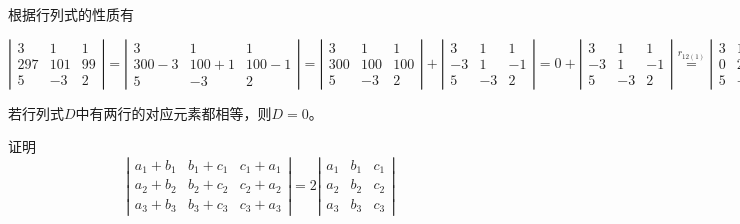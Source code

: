 \begin{solution}
    根据行列式的性质有

    $ \left|\begin{array}{cccc}
            3   & 1   & 1  \\
            297 & 101 & 99 \\
            5   & -3  & 2
        \end{array}\right|=
        \left|\begin{array}{cccc}
            3     & 1     & 1     \\
            300-3 & 100+1 & 100-1 \\
            5     & -3    & 2
        \end{array}\right|=
        \left|\begin{array}{cccc}
            3   & 1   & 1   \\
            300 & 100 & 100 \\
            5   & -3  & 2
        \end{array}\right|+
        \left|\begin{array}{cccc}
            3  & 1  & 1  \\
            -3 & 1  & -1 \\
            5  & -3 & 2
        \end{array}\right|
        = 0+\left|\begin{array}{cccc}
            3  & 1  & 1  \\
            -3 & 1  & -1 \\
            5  & -3 & 2
        \end{array}\right|
        \overset{r_{12(1)}}{=}
        \left|\begin{array}{cccc}
            3 & 1  & 1 \\
            0 & 2  & 0 \\
            5 & -3 & 2
        \end{array}\right|=12-10=2.$
\end{solution}


\begin{property}
    若行列式$D$中有两行的对应元素都相等，则$D=0$。
\end{property}

\begin{example}
    证明
    $$ \left|\begin{array}{cccc}
            a_{1}+b_{1} & b_{1}+c_{1} & c_{1}+a_{1} \\
            a_{2}+b_{2} & b_{2}+c_{2} & c_{2}+a_{2} \\
            a_{3}+b_{3} & b_{3}+c_{3} & c_{3}+a_{3}
        \end{array}\right|=2
        \left|\begin{array}{cccc}
            a_{1} & b_{1} & c_{1} \\
            a_{2} & b_{2} & c_{2} \\
            a_{3} & b_{3} & c_{3}
        \end{array}\right|
    $$
\end{example}


